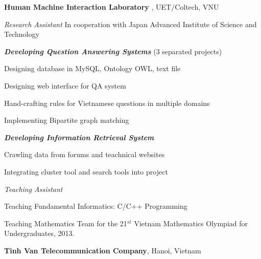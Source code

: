 \documentclass[9pt]{extreport}
\renewcommand{\section}[2]%
        {\pagebreak[2]\vspace{0.8\baselineskip}%
         \hspace{0in}%
         \marginpar{
         \raggedright \emph{#1}}#2}
\newenvironment{innerlist}[1][\enskip\textbullet]%
        {\vspace{0.2\baselineskip}\begin{compactitem}[#1]}{\end{compactitem}}
\begin{document}
\section{2010-2013}
\textbf{Human Machine Interaction Laboratory }, UET/Coltech, VNU
\begin{innerlist}
\item[] \textit{Research Assistant} \hfill In cooperation with Japan Advanced Institute of Science and Technology
    \begin{innerlist}
    \item \textbf{\textit{Developing Question Answering Systems}} (3 separated projects)
    \item Designing database in MySQL, Ontology OWL, text file
    \item Designing web interface for QA system
    \item Hand-crafting rules for Vietnamese questions in multiple domains
	\item Implementing Bipartite graph matching
    \item \textbf{\textit{Developing Information Retrieval System}}
    \item Crawling data from forums and teachnical websites
    \item Integrating cluster tool and search tools into project
    \end{innerlist}
\end{innerlist}
\vspace{.4\baselineskip}
\begin{innerlist}
\item[] \textit{Teaching Assistant} %
 	\begin{innerlist}
     \item Teaching Fundamental Informatics: C/C++ Programming
     \item Teaching Mathematics Team for the 21$^{st}$ Vietnam Mathematics Olympiad for Undergraduates, 2013.
    \end{innerlist}
\end{innerlist}


\section{2011}
\textbf{Tinh Van Telecommunication Company}, Hanoi, Vietnam
\end{document}
